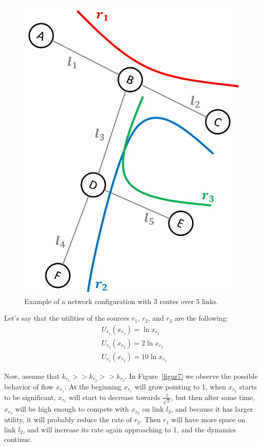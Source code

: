 \begin{figure}[h!]
\centering
\includegraphics[scale=.7]{NLink3Routes}
\caption{Example of a network configuration with 3 routes over 5 links.}
\label{figur6}
\end{figure}

Let's say that the utilities of the sources $r_1$, $r_2$, and $r_3$ are the following:
\begin{equation}
\begin{aligned}
&U_{r_1}(x_{r_1})=\ln{x_{r_1}} \\
&U_{r_2}(x_{r_2})=2\ln{x_{r_2}} \\
&U_{r_3}(x_{r_3})=10\ln{x_{r_3}}
\end{aligned}
\label{eq28}
\end{equation}

Now, assume that $k_{r_1} >> k_{r_2} >> k_{r_3}$. In Figure~\ref{figur7} we observe the possible behavior of flow $x_{r_1}$: At the beginning $x_{r_1}$ will grow pointing to 1, when $x_{r_2}$ starts to be significant, $x_{r_1}$ will start to decrease towards $\frac{1}{\sqrt{3}}$, but then after some time, $x_{r_3}$ will be high enough to compete with $x_{r_2}$ on link $l_3$, and because it has larger utility, it will probably reduce the rate of $r_2$. Then $r_1$ will have more space on link $l_2$, and will increase its rate again approaching to 1, and the dynamics continue.


